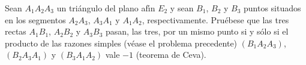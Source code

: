 \begin{enunciado}
 Sean $A_1A_2A_3$ un tri\'angulo del plano af\'{\i}n $E_2$ y sean $B_1$, $B_2$ y $B_3$ puntos situados en los segmentos $A_2A_3$, $A_3A_1$ y $A_1A_2$, respectivamente. Pru\'ebese que las tres rectas $A_1B_1$, $A_2B_2$ y $A_3B_3$ pasan, las tres, por un mismo punto si y s\'olo si el producto de las razones simples (v\'ease el problema precedente) $\left( B_1A_2A_3 \right)$, $\left( B_2A_3A_1 \right)$ y $\left( B_3A_1A_2 \right)$ vale $-1$ (teorema de Ceva).
\end{enunciado}

\begin{solucion}
 
\end{solucion}

